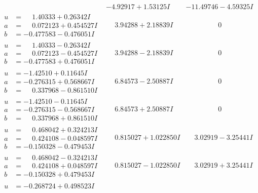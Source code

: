 \documentclass[1p]{elsarticle_modified}
\theoremstyle{definition}
\begin{document}
$$\begin{array}{c|c|c}
 & -4.92917 + 1.53125 I & -11.49746 - 4.59325 I \\ \hline\begin{aligned}
u &= \phantom{-}1.40333 + 0.26342 I \\
a &= \phantom{-}0.072123 + 0.454527 I \\
b &= -0.477583 - 0.476051 I\end{aligned}
 & \phantom{-}3.94288 + 2.18839 I & \phantom{-0.000000 } 0 \\ \hline\begin{aligned}
u &= \phantom{-}1.40333 - 0.26342 I \\
a &= \phantom{-}0.072123 - 0.454527 I \\
b &= -0.477583 + 0.476051 I\end{aligned}
 & \phantom{-}3.94288 - 2.18839 I & \phantom{-0.000000 } 0 \\ \hline\begin{aligned}
u &= -1.42510 + 0.11645 I \\
a &= -0.276315 + 0.568667 I \\
b &= \phantom{-}0.337968 - 0.861510 I\end{aligned}
 & \phantom{-}6.84573 - 2.50887 I & \phantom{-0.000000 } 0 \\ \hline\begin{aligned}
u &= -1.42510 - 0.11645 I \\
a &= -0.276315 - 0.568667 I \\
b &= \phantom{-}0.337968 + 0.861510 I\end{aligned}
 & \phantom{-}6.84573 + 2.50887 I & \phantom{-0.000000 } 0 \\ \hline\begin{aligned}
u &= \phantom{-}0.468042 + 0.324213 I \\
a &= \phantom{-}0.424108 - 0.048597 I \\
b &= -0.150328 - 0.479453 I\end{aligned}
 & \phantom{-}0.815027 + 1.022850 I & \phantom{-}3.02919 - 3.25441 I \\ \hline\begin{aligned}
u &= \phantom{-}0.468042 - 0.324213 I \\
a &= \phantom{-}0.424108 + 0.048597 I \\
b &= -0.150328 + 0.479453 I\end{aligned}
 & \phantom{-}0.815027 - 1.022850 I & \phantom{-}3.02919 + 3.25441 I \\ \hline\begin{aligned}
u &= -0.268724 + 0.498523 I \\

\end{aligned}
\end{array}$$
\end{document}
